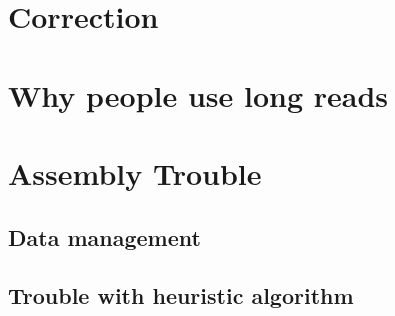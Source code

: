 \documentclass[./main.tex]{subfiles}
\begin{document}




\section{Correction}

\section{Why people use long reads}

\section{Assembly Trouble}

\subsection{Data management}

\subsection{Trouble with heuristic algorithm}

%
%
\end{document}
